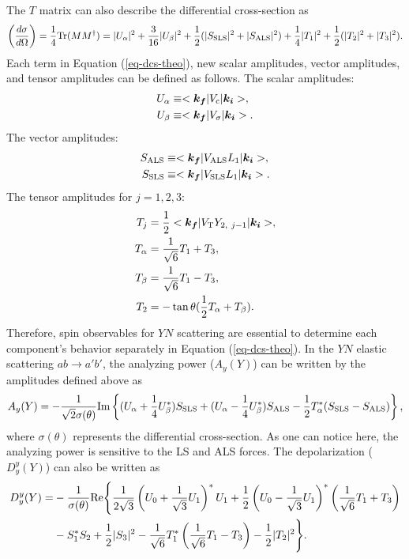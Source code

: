 The $T$ matrix can also describe the differential cross-section as
\begin{equation}
  \left( \frac{d\sigma}{d\Omega} \right) = \frac{1}{4}{\rm Tr}(MM^{\dagger}) = |U_{\alpha}|^{2} + \frac{3}{16}|U_{\beta}|^{2} 
  + \frac{1}{2}(|S_{\rm SLS}|^{2} + |S_{\rm ALS}|^{2}) + \frac{1}{4}|T_{1}|^{2} + \frac{1}{2}(|T_{2}|^{2} + |T_{3}|^{2}).
  \label{eq-dcs-theo}
\end{equation}
Each term in Equation (\ref{eq-dcs-theo}), new scalar amplitudes, vector amplitudes, and tensor amplitudes can be defined as follows. The scalar amplitudes:
\begin{align}  
  U_{\alpha} &\equiv <\bm{k_f}|V_{\rm c}|\bm{k_i}> ,\\
  U_{\beta} &\equiv <\bm{k_f}|V_{\rm \sigma}|\bm{k_i}>.
  \label{eq-scalarAmp}
\end{align}
The vector amplitudes:
\begin{align}  
  S_{\rm ALS} &\equiv <\bm{k_f}|V_{\rm ALS}L_{1}|\bm{k_i}>, \\
  S_{\rm SLS} &\equiv <\bm{k_f}|V_{\rm SLS}L_{1}|\bm{k_i}>.
  \label{eq-vectorAmp}
\end{align}
The tensor amplitudes for $j=1,2,3$:
\begin{align}  
  T_{j} &= \frac{1}{2} <\bm{k_f}|V_{\rm T}Y_{2,\ j-1}|\bm{k_i}>, \\
  T_{\alpha} &= \frac{1}{\sqrt{6}}T_{1} + T_{3}, \\
  T_{\beta} &= \frac{1}{\sqrt{6}}T_{1} - T_{3}, \\
  T_{2} &= -\tan{\theta} (\frac{1}{2} T_{\alpha} + T_{\beta}).
  \label{eq-tensorAmp}
\end{align}
Therefore, spin observables for $YN$ scattering are essential to determine each component's behavior separately in Equation (\ref{eq-dcs-theo}). In the $YN$ elastic scattering $ab\to a'b'$, the analyzing power ($A_{y}(Y)$) can be written by the amplitudes defined above as
\begin{equation}
  A_{y}(Y) = -\frac{1}{\sqrt{2}\sigma(\theta)} {\rm Im} \left\{ 
  (U_{\alpha} + \frac{1}{4}U_{\beta}^{*})S_{\rm SLS} 
  + (U_{\alpha} - \frac{1}{4}U_{\beta}^{*})S_{\rm ALS} 
  - \frac{1}{2}T_{\alpha}^{*}(S_{\rm SLS} - S_{\rm ALS}) \right\},
\end{equation}
where $\sigma(\theta)$ represents the differential cross-section. As one can notice here, the analyzing power is sensitive to the LS and ALS forces. The depolarization ($D^{y}_{y}(Y)$) can also be written as
\begin{equation}
\begin{split}
  D^{y}_{y}(Y) =& -\frac{1}{\sigma(\theta)} {\rm Re} \Biggl\{ 
  \frac{1}{2\sqrt{3}} \left( U_{0} + \frac{1}{\sqrt{3}}U_{1} \right)^{*}U_{1} + 
  \frac{1}{2} \left( U_{0} - \frac{1}{\sqrt{3}}U_{1} \right)^{*} \left( \frac{1}{\sqrt{6}}T_{1} + T_{3} \right) \\
  & - S^{*}_{1}S_{2} + \frac{1}{2}|S_{3}|^{2} - \frac{1}{\sqrt{6}}T^{*}_{1} \left( \frac{1}{\sqrt{6}}T_{1} - T_{3} \right) - \frac{1}{2}|T_{2}|^{2} \Biggl\}.
\end{split}
\end{equation}
